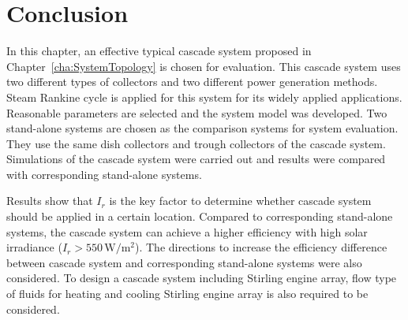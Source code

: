 \section{Conclusion}

In this chapter, an effective typical cascade system proposed in Chapter~\ref{cha:SystemTopology} is chosen for evaluation. 
This cascade system uses two different types of collectors and two different power generation methods. 
Steam Rankine cycle is applied for this system for its widely applied applications.
Reasonable parameters are selected and the system model was developed.
Two stand-alone systems are chosen as the comparison systems for system evaluation. 
They use the same dish collectors and trough collectors of the cascade system. 
Simulations of the cascade system were carried out and results were compared with corresponding stand-alone systems.

Results show that $I_r$ is the key factor to determine whether cascade system should be applied in a certain location. Compared to corresponding stand-alone systems, the cascade system can achieve a higher efficiency with high solar irradiance ($I_r > 550\,\mathrm{W/m^2}$). The directions to increase the efficiency difference between cascade system and corresponding stand-alone systems were also considered. To design a cascade system including Stirling engine array, flow type of fluids for heating and cooling Stirling engine array is also required to be considered. 

